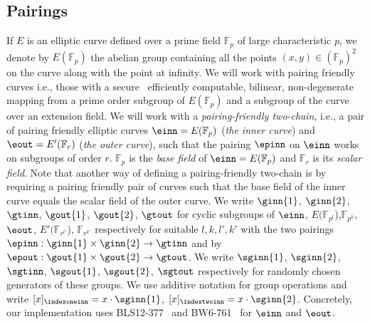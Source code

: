 \vspace{-0.05in}
\subsection{Pairings}
\label{sec:pairings}
\noindent If $E$ is an elliptic curve defined over a prime field $\mathbb{F}_{p}$ of large characteristic $p$, 
we denote by $E(\mathbb{F}_{p})$ the abelian group containing all the points $(x, y) \in (\mathbb{F}_{p})^2$ 
on the curve along with the point at infinity. We will work with pairing friendly curves i.e., those with a secure~\cite{secure_pairings,pairings_for_cryptographers} 
efficiently computable, bilinear, non-degenerate mapping from a prime order subgroup of $E(\mathbb{F}_{p})$ and a subgroup of the curve over an extension field.
We will work with a \emph{pairing-friendly two-chain}, i.e., a pair of pairing friendly elliptic curves $\einn=E(\mathbb{F}_{p})$ (\emph{the inner curve}) and 
$\eout=E'(\mathbb{F}_{r})$ (\emph{the outer curve}), such that the pairing $\epinn$ on $\einn$ works on subgroups of order $r$. $\mathbb{F}_p$ is the \emph{base field} of 
$\einn=E(\mathbb{F}_{p})$ and $\mathbb{F}_r$ is its \emph{scalar field}. Note that another way of defining a pairing-friendly two-chain is by requiring a pairing friendly 
pair of curves such that the base field of the inner curve equals the scalar field of the outer curve. 
We write $\ginn{1}$, $\ginn{2}$, $\gtinn$, $\gout{1}$, $\gout{2}$, $\gtout$ for cyclic subgroups of 
$\einn$, $E(\mathbb{F}_{p^l}$),$\mathbb{F}_{p^k}$, $\eout$, $E'(\mathbb{F}_{r^{l'}}$), $\mathbb{F}_{r^{k'}}$ respectively for suitable $l,k,l',k'$ with the two pairings 
$\epinn:\ginn{1} \times \ginn{2} \rightarrow \gtinn$ and by $\epout:\gout{1} \times \gout{2} \rightarrow \gtout$. We write $\sginn{1}$, $\sginn{2}$, $\sgtinn$, $\sgout{1}$, 
$\sgout{2}$, $\sgtout$ respectively for randomly chosen generators of these groups. We use additive notation for group operations and write 
$[x]_{\indexoneinn} = x \cdot \sginn{1}$, $[x]_{\indextwoinn} = x \cdot \sginn{2}$. Concretely, our implementation uses BLS12-377~\cite{zexe} 
and BW6-761~\cite{BW6} for $\einn$ and $\eout$.

